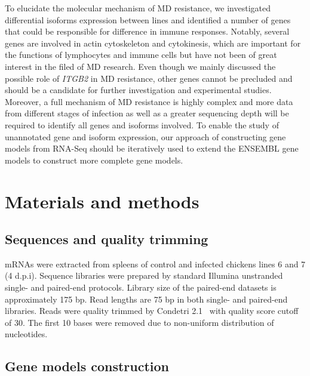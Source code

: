 \documentclass[10pt]{article}
\begin{document}
To elucidate the molecular mechanism of MD resistance, we
investigated differential isoforms expression between lines  and
identified a number of genes that could be responsible for
difference in immune responses. Notably, several genes are
involved in actin cytoskeleton and cytokinesis, which are
important for the functions of lymphocytes and immune cells but
have not been of great interest in the filed of MD research.
Even though we mainly discussed the possible role of {\em ITGB2}
in MD resistance, other genes cannot be precluded and should be a
candidate for further investigation and experimental studies.
Moreover, a full mechanism of MD resistance is highly complex and
more data from different stages of infection as well as a greater
sequencing depth will be required to identify all genes and
isoforms involved.  To enable the study of unannotated gene and
isoform expression, our approach of constructing gene models from
RNA-Seq should be iteratively used to extend the ENSEMBL gene
models to construct more complete gene models.

\section*{Materials and methods}

\subsection*{Sequences and quality trimming}

mRNAs were extracted from spleens of control and infected
chickens lines 6 and 7 (4 d.p.i).  Sequence libraries were
prepared by standard Illumina unstranded single- and paired-end
protocols.  Library size of the paired-end datasets is
approximately 175 bp.  Read lengths are 75 bp in both single- and
paired-end libraries.  Reads were quality trimmed by Condetri
2.1~\cite{smeds2011condetri} with quality score cutoff of 30.
The first 10 bases were removed due to non-uniform distribution
of nucleotides.

\subsection*{Gene models construction}
\end{document}
